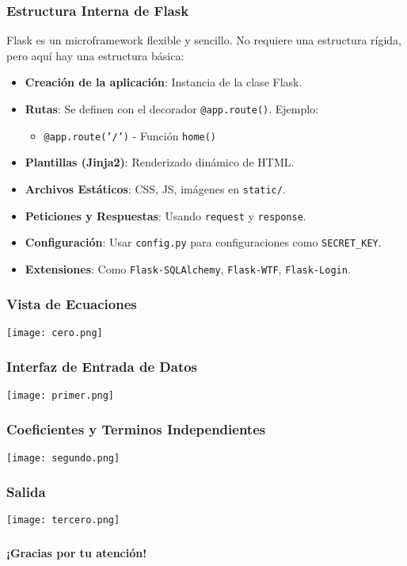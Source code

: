 \documentclass{beamer}
\begin{document}
\begin{frame}
  \frametitle{Estructura Interna de Flask}
  Flask es un microframework flexible y sencillo. No requiere una estructura rígida, pero aquí hay una estructura básica:

  \begin{itemize}
    \item \textbf{Creación de la aplicación}: Instancia de la clase Flask.
    \item \textbf{Rutas}: Se definen con el decorador \texttt{@app.route()}. Ejemplo:
    \begin{itemize}
      \item \texttt{@app.route('/')} - Función \texttt{home()}
    \end{itemize}
    \item \textbf{Plantillas (Jinja2)}: Renderizado dinámico de HTML.
    \item \textbf{Archivos Estáticos}: CSS, JS, imágenes en \texttt{static/}.
    \item \textbf{Peticiones y Respuestas}: Usando \texttt{request} y \texttt{response}.
    \item \textbf{Configuración}: Usar \texttt{config.py} para configuraciones como \texttt{SECRET\_KEY}.
    \item \textbf{Extensiones}: Como \texttt{Flask-SQLAlchemy}, \texttt{Flask-WTF}, \texttt{Flask-Login}.
  \end{itemize}
\end{frame}

\begin{frame}
    \frametitle{Vista de Ecuaciones}
    \begin{center}
        \texttt{[image: cero.png]}
    \end{center}
\end{frame}

\begin{frame}
    \frametitle{Interfaz de Entrada de Datos}
    \begin{center}
        \texttt{[image: primer.png]}
    \end{center}
\end{frame}

\begin{frame}
    \frametitle{Coeficientes y Terminos Independientes }
    \begin{center}
        \texttt{[image: segundo.png]}
    \end{center}
\end{frame}

\begin{frame}
    \frametitle{Salida}
    \begin{center}
        \texttt{[image: tercero.png]}
    \end{center}
\end{frame}

\begin{frame}
    \frametitle{}
    \begin{center}
        \huge \textbf{¡Gracias por tu atención!}
    \end{center}
\end{frame}
\end{document}
